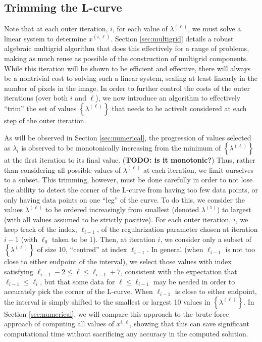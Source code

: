 \subsection{Trimming the L-curve}

Note that at each outer iteration, $i$, for each value of
$\lambda^{(\ell)}$, we must solve a linear system to determine
$x^{(i,\ell)}$.  Section \ref{sec:multigrid} details a robust
algebraic multigrid algorithm that does this effectively for a range
of problems, making as much reuse as possible of the construction of
multigrid components.  While this iteration will be shown to be
efficient and effective, there will always be a nontrivial cost to
solving such a linear system, scaling at least linearly in the number
of pixels in the image.  In order to further control the costs of the
outer iterations (over both $i$ and $\ell$), we now introduce an
algorithm to effectively ``trim'' the set of values
$\left\{\lambda^{(\ell)}\right\}$ that needs to be activelt considered
at each step of the outer iteration.

As will be observed in Section \ref{sec:numerical}, the progression of
values selected as $\lambda_i$ is observed to be monotonically
increasing from the minimum of $\left\{\lambda^{(\ell)}\right\}$ at
the first iteration to its final value.  ({\bf TODO: is it
  monotonic?})  Thus, rather than considering all possible values of
$\lambda^{(\ell)}$ at each iteration, we limit ourselves to a subset.
This trimming, however, must be done carefully in order to not lose
the ability to detect the corner of the L-curve from having too few
data points, or only having data points on one ``leg'' of the curve.
To do this, we consider the values $\lambda^{(\ell)}$ to be ordered
increasingly from smallest (denoted $\lambda^{(1)}$) to largest (with
all values assumed to be strictly positive).  For each outer
iteration, $i$, we keep track of the index, $\ell_{i-1}$, of the
regularization parameter chosen at iteration $i-1$ (with $\ell_0$
taken to be $1$).  Then, at iteration $i$, we consider only a subset
of $\left\{\lambda^{(\ell)}\right\}$ of size 10, ``centred'' at index
$\ell_{i-1}$.  In general (when $\ell_{i-1}$ is not too close to
either endpoint of the interval), we select those values with index
satisfying $\ell_{i-1}-2 \leq \ell \leq \ell_{i-1}+7$, consistent with
the expectation that $\ell_{i-1} \leq \ell_i$, but that some data for
$\ell \leq \ell_{i-1}$ may be needed in order to accurately pick the
corner of the L-curve.  When $\ell_{i-1}$ is close to either endpoint,
the interval is simply shifted to the smallest or largest 10 values in
$\left\{\lambda^{(\ell)}\right\}$.  In Section \ref{sec:numerical}, we
will compare this approach to the brute-force approach of computing
all values of $x^{i,\ell}$, showing that this can save significant
computational time without sacrificing any accuracy in the computed
solution.



